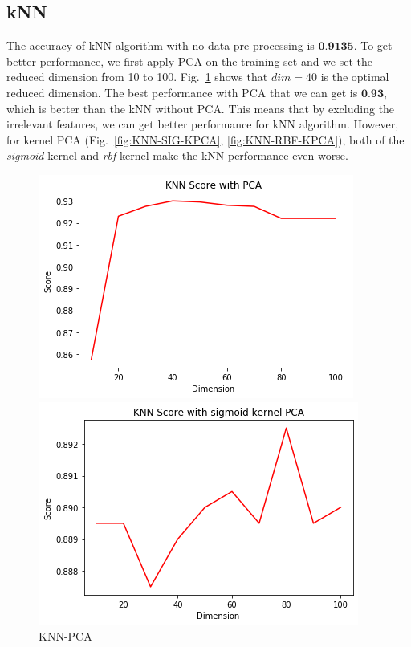 \documentclass[12pt]{article}
\begin{document}
\subsection{kNN}
The accuracy of kNN algorithm with no data pre-processing is $\textbf{0.9135}$. To get better performance, we first apply PCA on the training set and we set the reduced dimension from 10 to 100. Fig.~\ref{fig:KNN-PCA} shows that $dim=40$ is the optimal reduced dimension. The best performance with PCA that we can get is $\textbf{0.93}$, which is better than the kNN without PCA. This means that by excluding the irrelevant features, we can get better performance for kNN algorithm. 
However, for kernel PCA (Fig.~\ref{fig:KNN-SIG-KPCA}, \ref{fig:KNN-RBF-KPCA}), both of the \emph{sigmoid} kernel and \emph{rbf} kernel make the kNN performance even worse. 
\begin{figure}[htpb]
	\centering
	\begin{minipage}{.3\textwidth}
		\centering
		\includegraphics[width=\linewidth]{./exp-figs/KNN-PCA.png}
		\caption{KNN-PCA}
		\label{fig:KNN-PCA}
	\end{minipage}%
	\begin{minipage}{0.3\textwidth}
		\centering
		\includegraphics[width=\linewidth]{./exp-figs/KNN-SIG-KPCA.png}

\end{minipage}
\end{figure}
\end{document}
